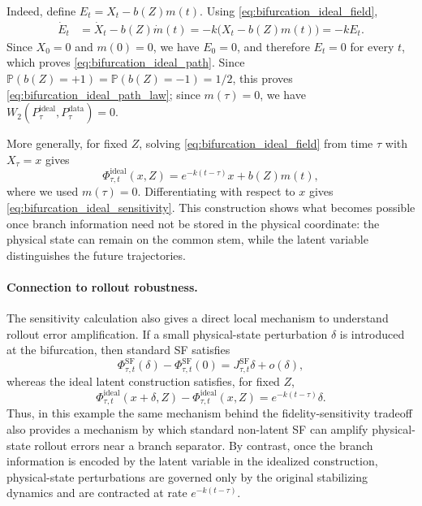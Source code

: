 Indeed, define
$E_t=X_t-b(Z)m(t).$
Using \eqref{eq:bifurcation_ideal_field},
\begin{align}
\dot E_t
&=
\dot X_t-b(Z)\dot m(t)
=
-k\bigl(X_t-b(Z)m(t)\bigr)
=
-kE_t.
\end{align}
Since $X_0=0$ and $m(0)=0$, we have $E_0=0$, and therefore
$E_t=0$ for every $t$, which proves
\eqref{eq:bifurcation_ideal_path}. Since
$\mathbb P(b(Z)=+1)=\mathbb P(b(Z)=-1)=1/2$, this proves
\eqref{eq:bifurcation_ideal_path_law}; since $m(\tau)=0$, we have $W_2\left(
P_{\tau}^{\mathrm{ideal}},
P_{\tau}^{\mathrm{data}}
\right)
=0$.

More generally, for fixed $Z$, solving
\eqref{eq:bifurcation_ideal_field} from time $\tau$ with
$X_\tau=x$ gives
\begin{equation}
\Phi_{\tau,t}^{\mathrm{ideal}}(x,Z)
=
e^{-k(t-\tau)}x+b(Z)m(t),
\end{equation}
where we used $m(\tau)=0$. Differentiating with respect to $x$
gives \eqref{eq:bifurcation_ideal_sensitivity}.
This construction shows what becomes possible once branch information
need not be stored in the physical coordinate: the physical state can remain
on the common stem, while the latent variable distinguishes the future
trajectories.

\paragraph{Connection to rollout robustness.}
The sensitivity calculation also gives a direct local mechanism to understand rollout
error amplification. If a small physical-state perturbation $\delta$ is
introduced at the bifurcation, then standard SF satisfies
\begin{equation}
\Phi_{\tau,t}^{\mathrm{SF}}(\delta)
-
\Phi_{\tau,t}^{\mathrm{SF}}(0)
=
J_{\tau,t}^{\mathrm{SF}}\delta
+
o(\delta),
\label{eq:bifurcation_sf_perturbation}
\end{equation}
whereas the ideal latent construction satisfies, for fixed $Z$,
\begin{equation}
\Phi_{\tau,t}^{\mathrm{ideal}}(x+\delta,Z)
-
\Phi_{\tau,t}^{\mathrm{ideal}}(x,Z)
=
e^{-k(t-\tau)}\delta.
\label{eq:bifurcation_ideal_perturbation}
\end{equation}
Thus, in this example the same mechanism behind the 
fidelity-sensitivity tradeoff also provides a mechanism by which standard
non-latent SF can amplify physical-state rollout errors near a branch
separator. By contrast, once the branch information is encoded by the
latent variable in the idealized construction, physical-state perturbations
are governed only by the original stabilizing dynamics and are contracted
at rate $e^{-k(t-\tau)}$.

